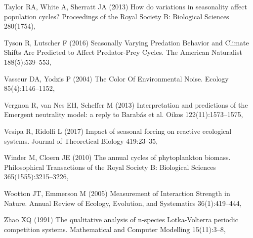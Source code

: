 \documentclass[a4paper,12pt]{article}
\begin{document}
\begin{thebibliography}{56}
Taylor RA, White A, Sherratt JA (2013) How do variations in seasonality affect
  population cycles? Proceedings of the Royal Society B: Biological Sciences
  280(1754), 

Tyson R, Lutscher F (2016) Seasonally {Varying} {Predation} {Behavior} and
  {Climate} {Shifts} {Are} {Predicted} to {Affect} {Predator}-{Prey} {Cycles}.
  The American Naturalist 188(5):539--553, 

Vasseur DA, Yodzis P (2004) {T}he {C}olor {O}f {E}nvironmental {N}oise. Ecology
  85(4):1146--1152, 

Vergnon R, van Nes EH, Scheffer M (2013) Interpretation and predictions of the
  {Emergent} neutrality model: a reply to {Barab\'as} et al. Oikos
  122(11):1573--1575, 

Vesipa R, Ridolfi L (2017) Impact of seasonal forcing on reactive ecological
  systems. Journal of Theoretical Biology 419:23--35,

Winder M, Cloern JE (2010) The annual cycles of phytoplankton biomass.
  Philosophical Transactions of the Royal Society B: Biological Sciences
  365(1555):3215--3226, 

Wootton JT, Emmerson M (2005) Measurement of {Interaction} {Strength} in
  {Nature}. Annual Review of Ecology, Evolution, and Systematics
  36(1):419--444, 

Zhao XQ (1991) The qualitative analysis of n-species {L}otka-{V}olterra
  periodic competition systems. Mathematical and Computer Modelling
  15(11):3--8, 

\end{thebibliography}
\end{document}
